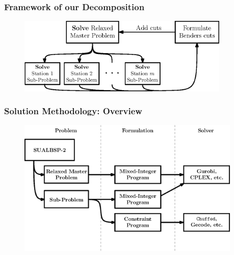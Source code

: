 \documentclass{beamer}
\begin{document}
\begin{frame}
\frametitle{Framework of our Decomposition}
\begin{figure}
	\centering
	\includegraphics[width=0.9\textwidth]{images/ourHighLevelBenders.eps}
\end{figure}
\end{frame}

\begin{frame}
\frametitle{Solution Methodology: Overview}
\begin{figure}
	\centering
	\includegraphics[width=0.95\textwidth]{images/bendersApproach.eps}
\end{figure}
\end{frame}
\end{document}
